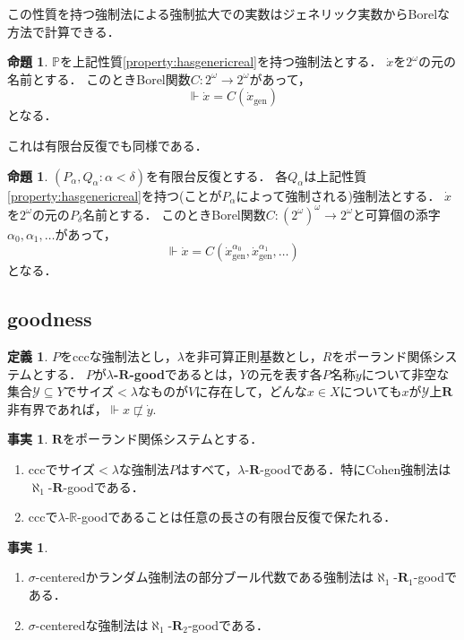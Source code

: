 \documentclass[uplatex,dvipdfmx]{jsarticle}
\renewcommand{\P}{\mathbb{P}}
\newcommand{\R}{\mathbb{R}}
\newcommand\forces{\Vdash}
\newcommand{\relR}{\mathbf{R}}
\renewcommand\subset{\subseteq}
\theoremstyle{definition}
\newtheorem{defi}[thm]{定義}
\newtheorem{fact}[thm]{事実}
\newtheorem{prop}[thm]{命題}
\begin{document}
		この性質を持つ強制法による強制拡大での実数はジェネリック実数からBorelな方法で計算できる．
		\begin{prop}
			$\P$を上記性質\ref{property:hasgenericreal}を持つ強制法とする．
			$\dot{x}$を$2^\omega$の元の名前とする．
			このときBorel関数$C \colon 2^\omega \to 2^\omega$があって，
			\[
			\forces \dot{x} = C(\dot{x}_\mathrm{gen})
			\]
			となる．
		\end{prop}
	
		これは有限台反復でも同様である．
		\begin{prop}
		$(P_\alpha, Q_\alpha : \alpha < \delta)$を有限台反復とする．
		各$Q_\alpha$は上記性質\ref{property:hasgenericreal}を持つ(ことが$P_\alpha$によって強制される)強制法とする．
		$\dot{x}$を$2^\omega$の元の$P_\delta$名前とする．
		このときBorel関数$C \colon (2^\omega)^\omega \to 2^\omega$と可算個の添字$\alpha_0, \alpha_1, \dots$があって，
		\[
		\forces \dot{x} = C(\dot{x}_\mathrm{gen}^{\alpha_0}, \dot{x}_\mathrm{gen}^{\alpha_1}, \dots)
		\]
		となる．
		\end{prop}
		
	\subsection{goodness}
	
	\begin{defi}
		$P$をcccな強制法とし，$\lambda$を非可算正則基数とし，$R$をポーランド関係システムとする．
		$P$が\textbf{$\lambda$-$\relR$-good}であるとは，$Y$の元を表す各$P$名称$\dot{y}$について非空な集合$\mathscr{Y} \subset Y$でサイズ$<\lambda$なものが$V$に存在して，どんな$x \in X$についても$x$が$\mathscr{Y}$上$\relR$非有界であれば，$\forces x \not \sqsubset \dot{y}$.
	\end{defi}

	\begin{fact}
		$\relR$をポーランド関係システムとする．
		\begin{enumerate}
			\item cccでサイズ$< \lambda$な強制法$P$はすべて，$\lambda$-$\relR$-goodである．特にCohen強制法は$\aleph_1$-$\relR$-goodである．
			\item cccで$\lambda$-$\R$-goodであることは任意の長さの有限台反復で保たれる．
		\end{enumerate}
	\end{fact}

	\begin{fact}\label{fact:goodness}
	\begin{enumerate}
		\item $\sigma$-centeredかランダム強制法の部分ブール代数である強制法は$\aleph_1$-$\relR_1$-goodである．
		\item $\sigma$-centeredな強制法は$\aleph_1$-$\relR_2$-goodである．
	\end{enumerate}
	\end{fact}
\end{document}
